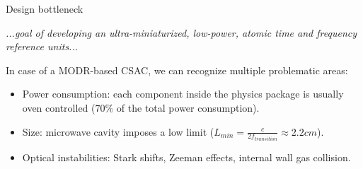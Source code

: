 \begin{frame}{Design bottleneck}

    \textit{...goal of developing an ultra-miniaturized, low-power, atomic time and frequency reference units...}

    \vspace{10pt}

    In case of a MODR-based CSAC, we can recognize multiple problematic areas:

    \begin{itemize}
        \item Power consumption: each component inside the physics package is usually oven controlled ($70\%$ of the total power consumption).
        \item Size: microwave cavity imposes a low limit ($L_{min} = \frac{c}{2f_{transition}} \approx 2.2cm$).
        \item Optical instabilities\footnotemark[1]: Stark shifts, Zeeman effects, internal wall gas collision.
    \end{itemize}


\end{frame}






